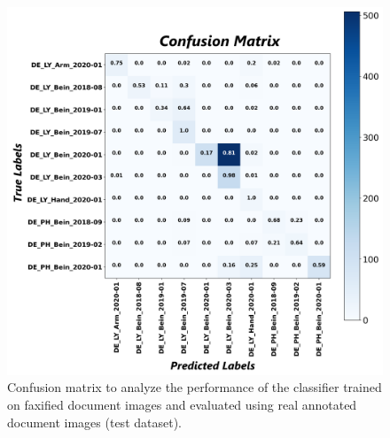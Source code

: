\begin{figure}[H]
    \begin{center}
	\includegraphics[scale=0.25]{images/Appendix/Confusion_Matrix_Faxified_Data_Classifier_2021-05-31_19-31-35.png}
	\caption[Confusion matrix to analyze the performance of the classifier trained on faxified document images and evaluated using real annotated document images (test dataset).]{Confusion matrix to analyze the performance of the classifier trained on faxified document images and evaluated using real annotated document images (test dataset).}
	\label{fig:CMFaxifiedDocumentImagesClassifier}
	\end{center}
\end{figure}



